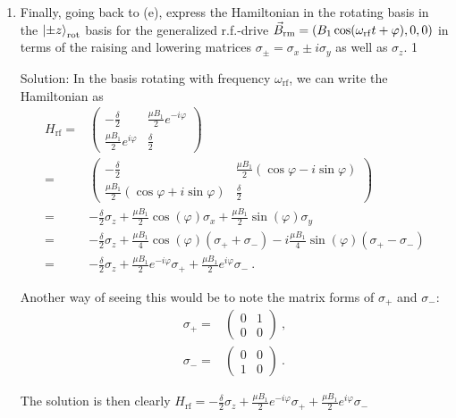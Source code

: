 \documentclass{../lab}
\begin{document}
\begin{enumerate}
\begin{enumerate}
Solution: This is still a rotation about the axis $(\cos\varphi,\sin\varphi,0)$ by an angle of $\theta=\mu B_1 t$. But the final state has $t=\frac {t_0} 2$. So $\theta = \frac \pi 2$ and $\phi=\varphi-\frac \pi 2$.

The rotating frame will rotate much faster than the state rotates down as $B_z\gg B_1$, so the states look like:


		\item Finally, going back to (e), express the Hamiltonian in the rotating basis in the $\ket{\pm z}_{\rm rot}$ basis for the generalized r.f.-drive $\vec{B}_{\rm rm}=
			(B_1 \cos (\omega_{\rm rf} t+ \varphi),0 , 0)$ in terms of the 
		        raising and lowering matrices $\sigma_\pm=\sigma_x\pm i \sigma_y$ as well as $\sigma_z$.
			{1}
			
			Solution: In the basis rotating with frequency $\omega_\text{rf}$, we can write the Hamiltonian as
\begin{align*}
	H_\text{rf} =& 
	\begin{pmatrix}
		-\frac{\delta}{2} & \frac{\mu B_1}{2} e^{-i\varphi}\\
		\frac{\mu B_1}{2} e^{i\varphi} & \frac{\delta}{2}
	\end{pmatrix} \\
	=& 
	\begin{pmatrix}
		-\frac{\delta}{2} & \frac{\mu B_1}{2} (\cos\varphi - i \sin\varphi)\\
		\frac{\mu B_1}{2} (\cos\varphi + i \sin\varphi) & \frac{\delta}{2}
	\end{pmatrix} \\
	=& 
	-\frac{\delta}{2} \sigma_z + \frac{\mu B_1}{2} \cos(\varphi) \sigma_x + \frac{\mu B_1}{2} \sin(\varphi) \sigma_y \\
	=& 
	-\frac{\delta}{2} \sigma_z + \frac{\mu B_1}{4} \cos(\varphi) (\sigma_+ + \sigma_-) - i \frac{\mu B_1}{4} \sin(\varphi) (\sigma_+ - \sigma_-) \\
	=& -\frac{\delta}{2} \sigma_z + \frac{\mu B_1}{2} e^{-i \varphi} \sigma_+  + \frac{\mu B_1}{2}e^{i \varphi} \sigma_-~.
\end{align*}

Another way of seeing this would be to note the matrix forms of $\sigma_+$ and $\sigma_-$:
\begin{align*}
	\sigma_+ =& 
		\begin{pmatrix}
			0 & 1 \\
			0 & 0
		\end{pmatrix}~, \\
	\sigma_- =&
		\begin{pmatrix}
			0 & 0 \\
			1 & 0
		\end{pmatrix}~.
\end{align*}

The solution is then clearly
$H_{\text{rf}} =  -\frac{\delta}{2} \sigma_z + \frac{\mu B_1}{2} e^{-i \varphi} \sigma_+  + \frac{\mu B_1}{2}e^{i \varphi} \sigma_-$


\end{enumerate}
\end{enumerate}
\end{document}
